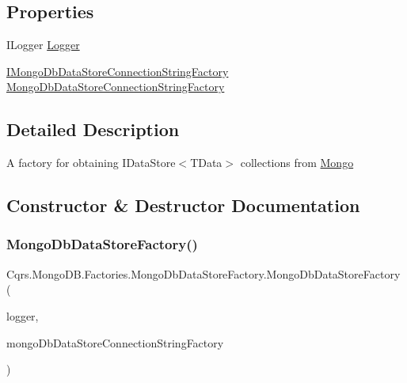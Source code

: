 \subsection*{Properties}
\begin{DoxyCompactItemize}
\item 
I\+Logger \hyperlink{classCqrs_1_1MongoDB_1_1Factories_1_1MongoDbDataStoreFactory_a2756ef3d362bd2c95193e113fa6f9e6d_a2756ef3d362bd2c95193e113fa6f9e6d}{Logger}
\item 
\hyperlink{interfaceCqrs_1_1MongoDB_1_1Factories_1_1IMongoDbDataStoreConnectionStringFactory}{I\+Mongo\+Db\+Data\+Store\+Connection\+String\+Factory} \hyperlink{classCqrs_1_1MongoDB_1_1Factories_1_1MongoDbDataStoreFactory_aa19c3db791da60ae4d91a1c667549de7_aa19c3db791da60ae4d91a1c667549de7}{Mongo\+Db\+Data\+Store\+Connection\+String\+Factory}
\end{DoxyCompactItemize}


\subsection{Detailed Description}
A factory for obtaining I\+Data\+Store$<$\+T\+Data$>$ collections from \hyperlink{namespaceCqrs_1_1Mongo}{Mongo} 



\subsection{Constructor \& Destructor Documentation}
\mbox{\label{classCqrs_1_1MongoDB_1_1Factories_1_1MongoDbDataStoreFactory_a5306704647ba6dab35844231ca999b7e_a5306704647ba6dab35844231ca999b7e}} 
\subsubsection{\texorpdfstring{Mongo\+Db\+Data\+Store\+Factory()}{MongoDbDataStoreFactory()}}
{\footnotesize\ttfamily Cqrs.\+Mongo\+D\+B.\+Factories.\+Mongo\+Db\+Data\+Store\+Factory.\+Mongo\+Db\+Data\+Store\+Factory (\begin{DoxyParamCaption}\item[{I\+Logger}]{logger,  }\item[{\hyperlink{interfaceCqrs_1_1MongoDB_1_1Factories_1_1IMongoDbDataStoreConnectionStringFactory}{I\+Mongo\+Db\+Data\+Store\+Connection\+String\+Factory}}]{mongo\+Db\+Data\+Store\+Connection\+String\+Factory }\end{DoxyParamCaption})}




